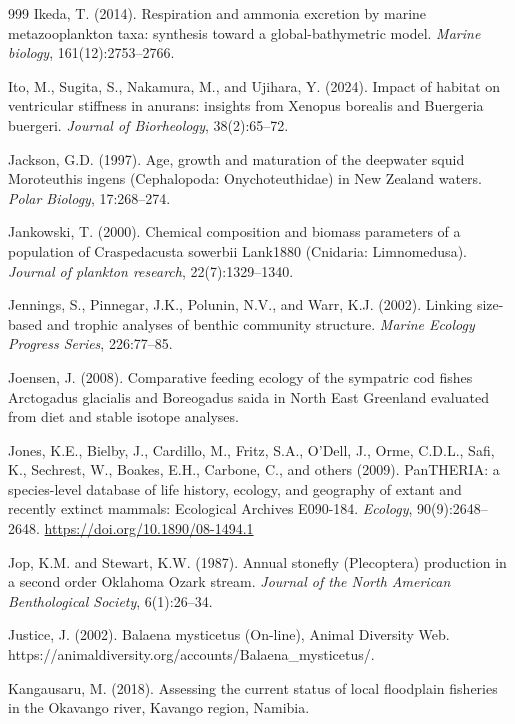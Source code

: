 \begin{thebibliography}{999}
Ikeda, T. (2014). Respiration and ammonia excretion by marine metazooplankton taxa: synthesis toward a global-bathymetric model. \textit{Marine biology}, 161(12):2753--2766.

Ito, M., Sugita, S., Nakamura, M., and Ujihara, Y. (2024). Impact of habitat on ventricular stiffness in anurans: insights from Xenopus borealis and Buergeria buergeri. \textit{Journal of Biorheology}, 38(2):65--72.

Jackson, G.D. (1997). Age, growth and maturation of the deepwater squid Moroteuthis ingens (Cephalopoda: Onychoteuthidae) in New Zealand waters. \textit{Polar Biology}, 17:268--274.

Jankowski, T. (2000). Chemical composition and biomass parameters of a population of Craspedacusta sowerbii Lank1880 (Cnidaria: Limnomedusa). \textit{Journal of plankton research}, 22(7):1329--1340.

Jennings, S., Pinnegar, J.K., Polunin, N.V., and Warr, K.J. (2002). Linking size-based and trophic analyses of benthic community structure. \textit{Marine Ecology Progress Series}, 226:77--85.

Joensen, J. (2008). Comparative feeding ecology of the sympatric cod fishes Arctogadus glacialis and Boreogadus saida in North East Greenland evaluated from diet and stable isotope analyses.

Jones, K.E., Bielby, J., Cardillo, M., Fritz, S.A., O'Dell, J., Orme, C.D.L., Safi, K., Sechrest, W., Boakes, E.H., Carbone, C., and others (2009). PanTHERIA: a species-level database of life history, ecology, and geography of extant and recently extinct mammals: Ecological Archives E090-184. \textit{Ecology}, 90(9):2648--2648. \url{https://doi.org/10.1890/08-1494.1}

Jop, K.M. and Stewart, K.W. (1987). Annual stonefly (Plecoptera) production in a second order Oklahoma Ozark stream. \textit{Journal of the North American Benthological Society}, 6(1):26--34.

Justice, J. (2002). Balaena mysticetus (On-line), Animal Diversity Web. https://animaldiversity.org/accounts/Balaena\_mysticetus/.

Kangausaru, M. (2018). Assessing the current status of local floodplain fisheries in the Okavango river, Kavango region, Namibia.


\end{thebibliography}
